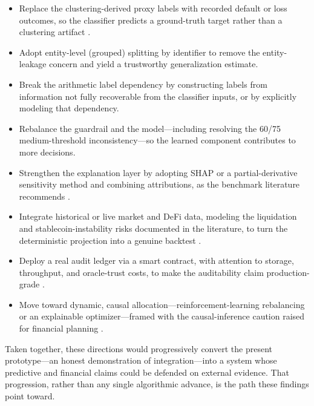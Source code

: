 \begin{itemize}
\item[\textbf{1)}] Replace the clustering-derived proxy labels with recorded default or
  loss outcomes, so the classifier predicts a ground-truth target rather than a clustering
  artifact \cite{ref18,ref19}.
\item[\textbf{2)}] Adopt entity-level (grouped) splitting by identifier to remove the
  entity-leakage concern and yield a trustworthy generalization estimate.
\item[\textbf{3)}] Break the arithmetic label dependency by constructing labels from
  information not fully recoverable from the classifier inputs, or by explicitly modeling
  that dependency.
\item[\textbf{4)}] Rebalance the guardrail and the model---including resolving the 60/75
  medium-threshold inconsistency---so the learned component contributes to more decisions.
\item[\textbf{5)}] Strengthen the explanation layer by adopting SHAP or a partial-derivative
  sensitivity method and combining attributions, as the benchmark literature recommends
  \cite{ref10,ref21}.
\item[\textbf{6)}] Integrate historical or live market and DeFi data, modeling the
  liquidation and stablecoin-instability risks documented in the literature, to turn the
  deterministic projection into a genuine backtest \cite{ref5,ref6}.
\item[\textbf{7)}] Deploy a real audit ledger via a smart contract, with attention to
  storage, throughput, and oracle-trust costs, to make the auditability claim
  production-grade \cite{ref13,ref14,ref15,ref22}.
\item[\textbf{8)}] Move toward dynamic, causal allocation---reinforcement-learning
  rebalancing or an explainable optimizer---framed with the causal-inference caution raised
  for financial planning \cite{ref4,ref8,ref12}.
\end{itemize}

Taken together, these directions would progressively convert the present prototype---an
honest demonstration of integration---into a system whose predictive and financial claims
could be defended on external evidence. That progression, rather than any single algorithmic
advance, is the path these findings point toward.
